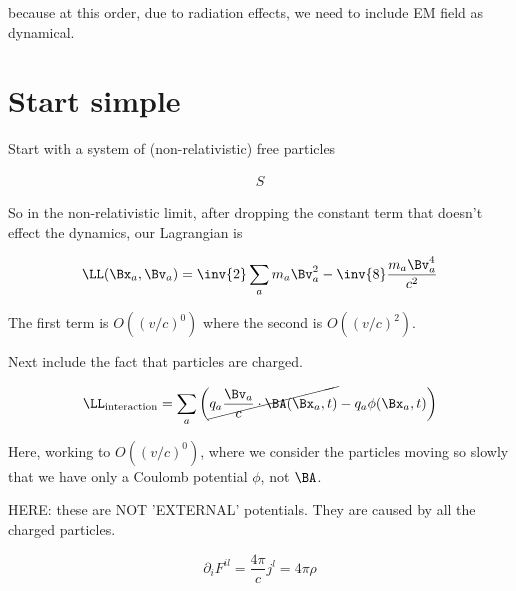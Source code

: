 because at this order, due to radiation effects, we need to include EM field as dynamical.

\section{Start simple}

Start with a system of (non-relativistic) free particles

\begin{align*}
S 
\end{align*}

So in the non-relativistic limit, after dropping the constant term that doesn't effect the dynamics, our Lagrangian is 

\begin{equation}\label{eqn:relativisticElectrodynamicsL24:90}
\LL(\Bx_a, \Bv_a) = \inv{2} \sum_a m_a \Bv_a^2 - \inv{8} \frac{m_a \Bv_a^4}{c^2}
\end{equation}

The first term is $O((v/c)^0)$ where the second is $O((v/c)^2)$.

Next include the fact that particles are charged.

\begin{equation}\label{eqn:relativisticElectrodynamicsL24:110}
\LL_{\text{interaction}} = \sum_a \left( \cancel{q_a \frac{\Bv_a}{c} \cdot \BA(\Bx_a, t)} - q_a \phi(\Bx_a, t) \right)
\end{equation}

Here, working to $O((v/c)^0)$, where we consider the particles moving so slowly that we have only a Coulomb potential $\phi$, not $\BA$.

HERE: these are NOT 'EXTERNAL' potentials.  They are caused by all the charged particles.

\begin{equation}\label{eqn:relativisticElectrodynamicsL24:130}
\partial_i F^{i l} = \frac{4 \pi}{c} j^l = 4 \pi \rho
\end{equation}

